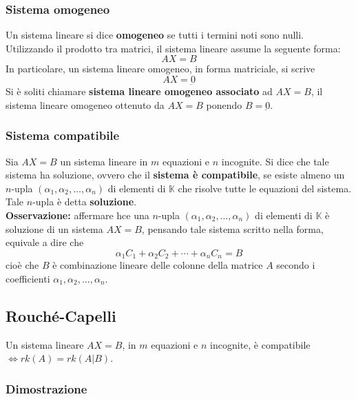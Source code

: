 \documentclass{article}
\newcommand{\s}[2]{#1_1, #1_2, \ldots, #1_{#2}}
\newcommand{\ah}{\alpha}
\begin{document}
\subsubsection{Sistema omogeneo}
Un sistema lineare si dice \textbf{omogeneo} se tutti i termini noti sono
nulli. Utilizzando il prodotto tra matrici, il sistema lineare assume la
seguente forma:
\[
    AX = B
\]
In particolare, un sistema lineare omogeneo, in forma matriciale, si scrive
\[
    AX = \underbar{0}
\]
Si è soliti chiamare \textbf{sistema lineare omogeneo associato} ad $AX = B$,
il sistema lineare omogeneo ottenuto da $AX = B$ ponendo $B = \underbar{0}$.

\subsubsection{Sistema compatibile}
Sia $AX = B$ un sistema lineare in $m$ equazioni e $n$ incognite. Si dice che
tale sistema ha soluzione, ovvero che il \textbf{sistema è compatibile}, se
esiste almeno un $n$-upla $ (\s{\ah}{n})$ di elementi di $\mathbb{K}$ che
risolve tutte le equazioni del sistema. Tale $n$-upla è detta
\textbf{soluzione}.\\ \textbf{Osservazione:} affermare hce una $n$-upla $
    (\s{\ah}{n})$ di elementi di $\mathbb{K}$ è soluzione di un sistema $AX = B$,
pensando tale sistema scritto nella forma, equivale a dire che
\[
    \ah_1C_1 + \ah_2C_2 + \cdots + \ah_nC_n = B
\]
cioè che $B$ è combinazione lineare delle colonne della matrice $A$ secondo i
coefficienti $\ah_1, \ah_2, \ldots, \ah_n$.

\subsection{Rouché-Capelli}
Un sistema lineare $AX = B$, in $m$ equazioni e $n$ incognite, è compatibile
$\iff rk (A) = rk (A|B)$.

\subsubsection{Dimostrazione}
\end{document}
